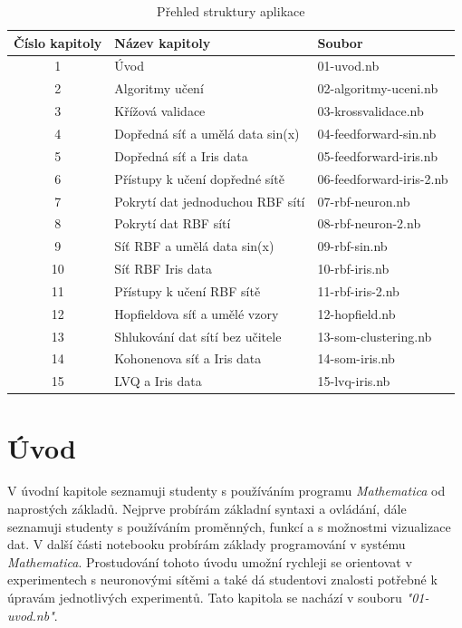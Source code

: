 \documentclass[11pt,twoside,a4paper]{book}
\begin{document}
\begin{center}
\begin{table}[h]
\begin{tabular}{|c|l|l|}
\hline 
Číslo kapitoly & Název kapitoly & Soubor \\ \hline
1 & Úvod & 01-uvod.nb \\ \hline
2 & Algoritmy učení & 02-algoritmy-uceni.nb \\ \hline
3 & Křížová validace & 03-krossvalidace.nb \\ \hline
4 & Dopředná síť a umělá data sin(x) & 04-feedforward-sin.nb \\ \hline
5 & Dopředná síť a Iris data & 05-feedforward-iris.nb \\ \hline
6 & Přístupy k učení dopředné sítě & 06-feedforward-iris-2.nb \\ \hline
7 & Pokrytí dat jednoduchou RBF sítí & 07-rbf-neuron.nb \\ \hline
8 & Pokrytí dat RBF sítí & 08-rbf-neuron-2.nb \\ \hline
9 & Síť RBF a umělá data sin(x) & 09-rbf-sin.nb \\ \hline
10 & Síť RBF  Iris data & 10-rbf-iris.nb \\ \hline
11 & Přístupy k učení RBF sítě & 11-rbf-iris-2.nb \\ \hline
12 & Hopfieldova síť a umělé vzory & 12-hopfield.nb \\ \hline
13 & Shlukování dat sítí bez učitele & 13-som-clustering.nb \\ \hline
14 & Kohonenova síť a Iris data & 14-som-iris.nb \\ \hline
15 & LVQ a Iris data & 15-lvq-iris.nb \\ \hline
\end{tabular}
\caption{Přehled struktury aplikace}
\label{tab:aplikace}
\end{table}
\end{center}

\section{Úvod}
V úvodní kapitole seznamuji studenty s používáním programu \textit{Mathematica} od naprostých základů. Nejprve probírám základní syntaxi a ovládání, dále seznamuji studenty s používáním proměnných, funkcí a s možnostmi vizualizace dat. V další části notebooku probírám základy programování v systému \textit{Mathematica}. Prostudování tohoto úvodu umožní rychleji se orientovat v experimentech s neuronovými sítěmi a také dá studentovi znalosti potřebné k úpravám jednotlivých experimentů. Tato kapitola se nachází v souboru \textit{"01-uvod.nb"}.
\end{document}

